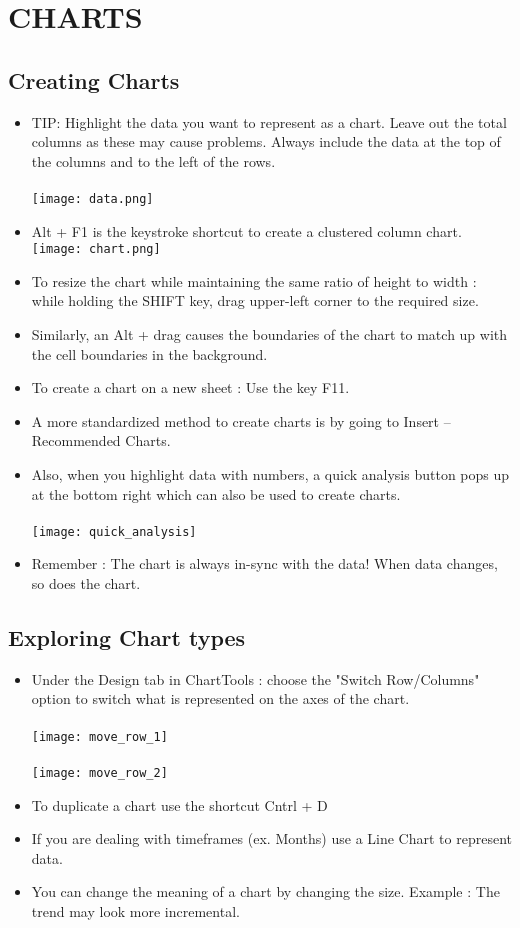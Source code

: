 \documentclass[11pt, oneside]{article}   	%
\begin{document}
\section{CHARTS}
\subsection{ Creating Charts}
\begin{itemize}
\item TIP: Highlight the data you want to represent as a chart. Leave out the total columns as these may cause problems. Always include the data at the top of the columns and to the left of the rows.\\
\bigskip \\
\texttt{[image: data.png]}
\bigskip \\
\item Alt + F1 is the keystroke shortcut to create a clustered column chart.
\bigskip \\
\texttt{[image: chart.png]}
\bigskip \\
\item To resize the chart while maintaining the same ratio of height to width : while holding the SHIFT key, drag upper-left corner to the required size.
\item Similarly, an Alt + drag causes the boundaries of the chart to match up with the cell boundaries in the background. 
\item To create a chart on a new sheet : Use the key F11.
\item A more standardized method to create charts is by going to Insert -- Recommended Charts.
\item Also, when you highlight data with numbers, a quick analysis button pops up at the bottom right which can also be used to create charts. \\
\bigskip \\
\texttt{[image: quick\_analysis]}
\bigskip \\
\item Remember : The chart is always in-sync with the data! When data changes, so does the chart.
\end{itemize}
\subsection{Exploring Chart types}
\begin{itemize}
\item Under the Design tab in ChartTools : choose the "Switch Row/Columns" option to switch what is represented on the axes of the chart. \\
\bigskip\\
\texttt{[image: move\_row\_1]} \\
\bigskip\\
\texttt{[image: move\_row\_2]}
\bigskip \\
\item To duplicate a chart use the shortcut Cntrl + D
\item If you are dealing with timeframes (ex. Months) use a Line Chart to represent data.
\item You can change the meaning of a chart by changing the size. Example : The trend may look more incremental.
\end{itemize}
\end{document}

